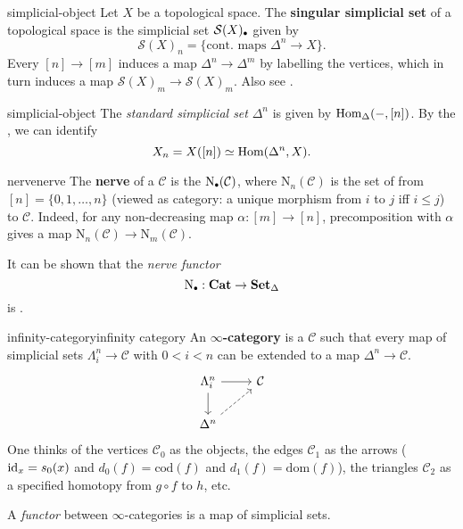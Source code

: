\begin{example}{simplicial-object}
    Let $X$ be a topological space. The \textbf{singular simplicial set} of a topological space is the simplicial set $\mathcal{S}(X)_\bdot$ given by
    \[ \mathcal{S}(X)_n = \{ \text{cont. maps } \Delta^n \to X \} . \]
    Every $[n] \to [m]$ induces a map $\Delta^n \to \Delta^m$ by labelling the vertices, which in turn induces a map $\mathcal{S}(X)_m \to \mathcal{S}(X)_m$. Also see .
\end{example}

\begin{example}{simplicial-object}
    The \textit{standard simplicial set} $\Delta^n$ is given by $\text{Hom}_\Delta(-, [n])$. By the , we can identify
    \[ X_n = X([n]) \simeq \text{Hom}(\Delta^n, X) . \]
\end{example}

\begin{topic}{nerve}{nerve}
    The \textbf{nerve} of a  $\mathcal{C}$ is the  $\text{N}_\bdot(\mathcal{C})$, where $\text{N}_n(\mathcal{C})$ is the set of  from $[n] = \{ 0, 1, \ldots, n \}$ (viewed as category: a unique morphism from $i$ to $j$ iff $i \le j$) to $\mathcal{C}$.
    Indeed, for any non-decreasing map $\alpha : [m] \to [n]$, precomposition with $\alpha$ gives a map $\text{N}_n(\mathcal{C}) \to \text{N}_m(\mathcal{C})$.
    
    It can be shown that the \textit{nerve functor}
    \[ \text{N}_\bdot : \textbf{Cat} \to \textbf{Set}_\Delta \]
    is  .
\end{topic}

\begin{topic}{infinity-category}{infinity category}
    An \textbf{$\infty$-category} is a  $\mathcal{C}$ such that every map of simplicial sets $\Lambda^n_i \to \mathcal{C}$ with $0 < i < n$ can be extended to a map $\Delta^n \to \mathcal{C}$.
    \[ \begin{tikzcd} \Lambda^n_i \arrow{r} \arrow{d} & \mathcal{C} \\ \Delta^n \arrow[dashed]{ur} & \end{tikzcd} \]
    One thinks of the vertices $\mathcal{C}_0$ as the objects, the edges $\mathcal{C}_1$ as the arrows ($\text{id}_x = s_0(x)$ and $d_0(f) = \text{cod}(f)$ and $d_1(f) = \text{dom}(f)$), the triangles $\mathcal{C}_2$ as a specified homotopy from $g \circ f$ to $h$, etc.
    
    A \textit{functor} between $\infty$-categories is a map of simplicial sets.
\end{topic}

